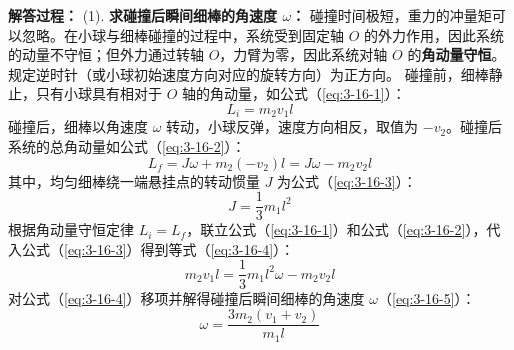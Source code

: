 \textbf{解答过程：}
(1). \textbf{求碰撞后瞬间细棒的角速度 $\omega$：}
碰撞时间极短，重力的冲量矩可以忽略。在小球与细棒碰撞的过程中，系统受到固定轴 $O$ 的外力作用，因此系统的动量不守恒；但外力通过转轴 $O$，力臂为零，因此系统对轴 $O$ 的\textbf{角动量守恒}。
规定逆时针（或小球初始速度方向对应的旋转方向）为正方向。
碰撞前，细棒静止，只有小球具有相对于 $O$ 轴的角动量，如公式（\ref{eq:3-16-1}）：
\begin{equation}\label{eq:3-16-1}
	L_i = m_2 v_1 l
\end{equation}
碰撞后，细棒以角速度 $\omega$ 转动，小球反弹，速度方向相反，取值为 $-v_2$。碰撞后系统的总角动量如公式（\ref{eq:3-16-2}）：
\begin{equation}\label{eq:3-16-2}
	L_f = J\omega + m_2 (-v_2) l = J\omega - m_2 v_2 l
\end{equation}
其中，均匀细棒绕一端悬挂点的转动惯量 $J$ 为公式（\ref{eq:3-16-3}）：
\begin{equation}\label{eq:3-16-3}
	J = \frac{1}{3}m_1 l^2
\end{equation}
根据角动量守恒定律 $L_i = L_f$，联立公式（\ref{eq:3-16-1}）和公式（\ref{eq:3-16-2}），代入公式（\ref{eq:3-16-3}）得到等式（\ref{eq:3-16-4}）：
\begin{equation}\label{eq:3-16-4}
	m_2 v_1 l = \frac{1}{3}m_1 l^2 \omega - m_2 v_2 l
\end{equation}
对公式（\ref{eq:3-16-4}）移项并解得碰撞后瞬间细棒的角速度 $\omega$（\ref{eq:3-16-5}）：
\begin{equation}\label{eq:3-16-5}
	\omega = \frac{3m_2(v_1 + v_2)}{m_1 l}
\end{equation}

